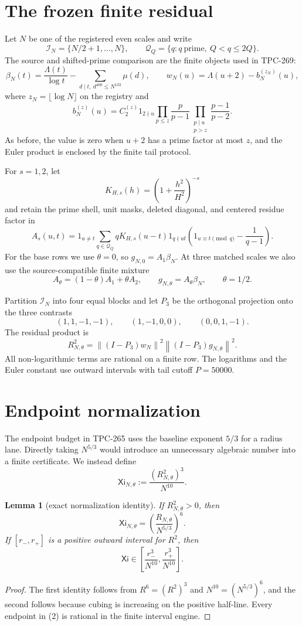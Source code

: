 \documentclass[11pt]{article}
\newtheorem{lemma}{Lemma}
\newcommand{\cI}{\mathcal I}
\newcommand{\norm}[1]{\left\lVert #1\right\rVert}
\newcommand{\XiN}{\mathsf{Xi}}
\begin{document}
\section{The frozen finite residual}
Let \(N\) be one of the registered even scales and write
\[
 \cI_N=\{N/2+1,\ldots,N\}, \qquad
 \mathcal Q_Q=\{q:q\ \mathrm{prime},\ Q<q\leq 2Q\}.
\]
The source and shifted-prime comparison are the finite objects used in TPC-269:
\[
 \beta_N(t)=\frac{\Lambda(t)}{\log t}
 -\sum_{d\mid t,\ d^{400}\leq N^{133}}\mu(d),
 \qquad w_N(u)=\Lambda(u+2)-b_N^{(z_N)}(u),
\]
where \(z_N=\lfloor\log N\rfloor\) on the registry and
\[
 b_N^{(z)}(u)=C_2^{(z)}1_{2\nmid u}
 \prod_{p\leq z}\frac p{p-1}
 \prod_{\substack{p\mid u\\p>z}}\frac{p-1}{p-2}.
\]
As before, the value is zero when \(u+2\) has a prime factor at most \(z\),
and the Euler product is enclosed by the finite tail protocol.

For \(s=1,2\), let
\[
 K_{H,s}(h)=\left(1+\frac{h^2}{H^2}\right)^{-s}
\]
and retain the prime shell, unit masks, deleted diagonal, and centered residue
factor in
\[
 A_s(u,t)=1_{u\ne t}\sum_{q\in\mathcal Q_Q}qK_{H,s}(u-t)1_{q\nmid ut}
 \left(1_{u\equiv t\pmod q}-\frac1{q-1}\right).
\]
For the base rows we use \(\theta=0\), so \(g_{N,0}=A_1\beta_N\). At three
matched scales we also use the source-compatible finite mixture
\[
 A_\theta=(1-\theta)A_1+\theta A_2, \qquad
 g_{N,\theta}=A_\theta\beta_N, \qquad \theta=1/2.
\]

Partition \(\cI_N\) into four equal blocks and let \(P_3\) be the orthogonal
projection onto the three contrasts
\[
 (1,1,-1,-1),\qquad (1,-1,0,0),\qquad (0,0,1,-1).
\]
The residual product is
\[
 R_{N,\theta}^2=\norm{(I-P_3)w_N}^2
                  \norm{(I-P_3)g_{N,\theta}}^2.
\]
All non-logarithmic terms are rational on a finite row. The logarithms and the
Euler constant use outward intervals with tail cutoff \(P=50000\).

\section{Endpoint normalization}
The endpoint budget in TPC-265 uses the baseline exponent \(5/3\) for a radius
lane. Directly taking \(N^{5/3}\) would introduce an unnecessary algebraic
number into a finite certificate. We instead define
\[
 \XiN_{N,\theta}:=\frac{(R_{N,\theta}^2)^3}{N^{10}}.
 \tag{1}
\]

\begin{lemma}[exact normalization identity]
If \(R_{N,\theta}^2>0\), then
\[
 \XiN_{N,\theta}=\left(\frac{R_{N,\theta}}{N^{5/3}}\right)^6.
\]
If \([r_-,r_+]\) is a positive outward interval for \(R^2\), then
\[
 \XiN\in\left[\frac{r_-^3}{N^{10}},\frac{r_+^3}{N^{10}}\right].
 \tag{2}
\]
\end{lemma}
\begin{proof}
The first identity follows from \(R^6=(R^2)^3\) and
\(N^{10}=(N^{5/3})^6\), and the second
follows because cubing is increasing on the positive half-line. Every endpoint
in (2) is rational in the finite interval engine.
\end{proof}
\end{document}
